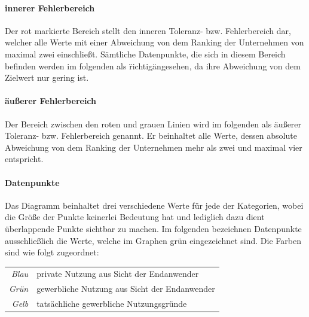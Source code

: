 \documentclass[a4paper]{article}
\begin{document}
                \paragraph{innerer Fehlerbereich}
                    Der rot markierte Bereich stellt den inneren Toleranz- bzw. Fehlerbereich dar, welcher alle Werte mit einer Abweichung von dem Ranking der Unternehmen von maximal zwei einschließt. Sämtliche Datenpunkte, die sich in diesem Bereich befinden werden im folgenden als \"richtig\" angesehen, da ihre Abweichung von dem Zielwert nur gering ist.
                    
                \paragraph{äußerer Fehlerbereich}
                    Der Bereich zwischen den roten und grauen Linien wird im folgenden als äußerer Toleranz- bzw. Fehlerbereich genannt. Er beinhaltet alle Werte, dessen absolute Abweichung von dem Ranking der Unternehmen mehr als zwei und maximal vier entspricht.
                    
                \paragraph{Datenpunkte}
                    Das Diagramm beinhaltet drei verschiedene Werte für jede der Kategorien, wobei die Größe der Punkte keinerlei Bedeutung hat und lediglich dazu dient überlappende Punkte sichtbar zu machen. Im folgenden bezeichnen Datenpunkte ausschließlich die Werte, welche im Graphen grün eingezeichnet sind. Die Farben sind wie folgt zugeordnet:\\
                    \begin{table}[H]
                        \centering
                        \bgroup
                        \def\arraystretch{1.5}
                        \begin{tabular}{ r | l }
                            \emph{Blau} & private Nutzung aus Sicht der Endanwender\\
                            \emph{Grün} & gewerbliche Nutzung aus Sicht der Endanwender\\
                            \emph{Gelb} & tatsächliche gewerbliche Nutzungsgründe
                        \end{tabular}
                        \egroup
                    \end{table}
                    
\end{document}
